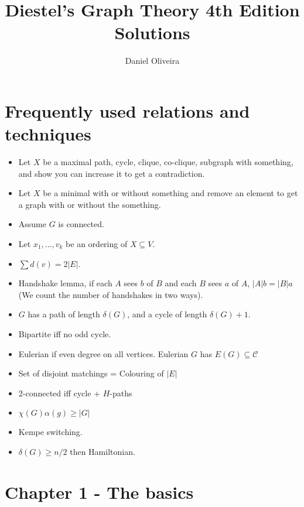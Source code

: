 \documentclass[11pt]{article}
\theoremstyle{plain}
\begin{document}
\title{Diestel's Graph Theory 4th Edition Solutions}
\author{Daniel Oliveira}
\maketitle

\section*{Frequently used relations and techniques}

\begin{itemize}

\item Let $X$ be a maximal path, cycle, clique, co-clique, subgraph with something, and show you can increase it to get a contradiction.
\item Let $X$ be a minimal with or without something and remove an element to get a graph with or without the something.
\item Assume $G$ is connected.
\item Let $x_1,\ldots,v_k$ be an ordering of $X\subseteq V$.

\item $\sum d(v) = 2|E|$.
\item Handshake lemma, if each $A$ sees $b$ of $B$ and each $B$ sees $a$ of $A$, $|A|b = |B|a$ (We count the number of handshakes in two ways).
\item $G$ has a path of length $\delta(G)$, and a cycle of length $\delta(G)+1$.
\item Bipartite iff no odd cycle.
\item Eulerian if even degree on all vertices. Eulerian $G$ has $E(G) \subseteq \mathcal{C}$

\item Set of disjoint matchings = Colouring of $|E|$

\item 2-connected iff cycle + $H$-paths

\item $\chi(G)\alpha(g) \geq |G|$
\item Kempe switching.


\item $\delta(G) \geq n/2$ then Hamiltonian.


\end{itemize}

\section*{Chapter 1 - The basics}
\end{document}
